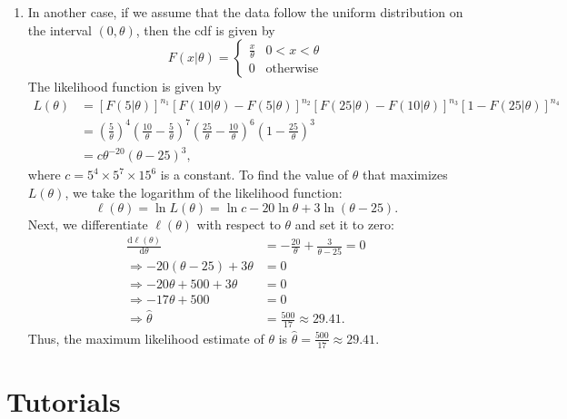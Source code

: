 \begin{solution}
\begin{enumerate}
        \item In another case, if we assume that the data follow the uniform distribution on the interval $(0, \theta)$, then the cdf is given by
        \[
            F(x|\theta) = \begin{cases}
                \frac{x}{\theta} & 0 < x < \theta\\
                0 & \text{otherwise}
            \end{cases}
        \]
        The likelihood function is given by
        \begin{align*}
            L(\theta) &= [F(5|\theta)]^{n_1} [F(10|\theta) - F(5|\theta)]^{n_2} [F(25|\theta) - F(10|\theta)]^{n_3} [1 - F(25|\theta)]^{n_4}\\
            &= \left(\frac{5}{\theta}\right)^4 \left(\frac{10}{\theta} - \frac {5}{\theta}\right)^7 \left(\frac{25}{\theta} - \frac{10}{\theta}\right)^6 \left(1 - \frac{25}{\theta}\right)^3\\
            &= c \theta^{-20} (\theta - 25)^3,
        \end{align*}
        where $c = 5^4 \times 5^7 \times 15^6$ is a constant. To find the value of $\theta$ that maximizes $L(\theta)$, we take the logarithm of the likelihood function:
        \[
            \ell(\theta) = \ln L(\theta) = \ln c - 20 \ln \theta + 3 \ln(\theta - 25).
        \]
        Next, we differentiate $\ell(\theta)$ with respect to $\theta$ and set it to zero:
        \begin{align*}
            \frac{\mathrm{d}\ell(\theta)}{\mathrm{d}\theta} &= -\frac{20}{\theta} + \frac{3}{\theta - 25} = 0\\
            \Rightarrow -20(\theta - 25) + 3\theta &= 0\\
            \Rightarrow -20\theta + 500 + 3\theta &= 0\\
            \Rightarrow -17\theta + 500 &= 0\\
            \Rightarrow \hat{\theta} &= \frac{500}{17} \approx 29.41.
        \end{align*}
        Thus, the maximum likelihood estimate of $\theta$ is $\hat{\theta} = \frac{500}{17} \approx 29.41$. 
    \end{enumerate}
\end{solution}

\section*{Tutorials}

